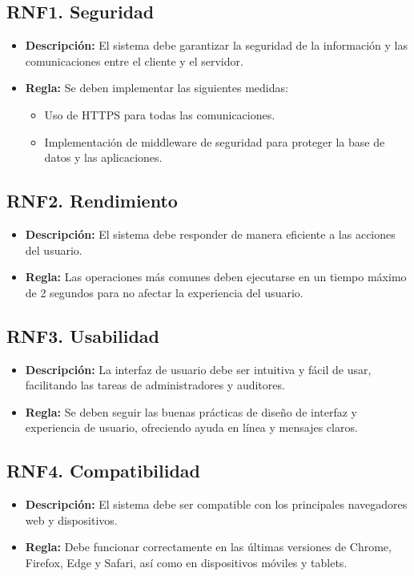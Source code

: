 \documentclass{article}
\begin{document}
\subsection{RNF1. Seguridad}
\begin{itemize}
    \item \textbf{Descripción:} El sistema debe garantizar la seguridad de la información y las comunicaciones entre el cliente y el servidor.
    \item \textbf{Regla:} Se deben implementar las siguientes medidas:
    \begin{itemize}
        \item Uso de HTTPS para todas las comunicaciones.
        \item Implementación de middleware de seguridad para proteger la base de datos y las aplicaciones.
    \end{itemize}
\end{itemize}

\subsection{RNF2. Rendimiento}
\begin{itemize}
    \item \textbf{Descripción:} El sistema debe responder de manera eficiente a las acciones del usuario.
    \item \textbf{Regla:} Las operaciones más comunes deben ejecutarse en un tiempo máximo de 2 segundos para no afectar la experiencia del usuario.
\end{itemize}

\subsection{RNF3. Usabilidad}
\begin{itemize}
    \item \textbf{Descripción:} La interfaz de usuario debe ser intuitiva y fácil de usar, facilitando las tareas de administradores y auditores.
    \item \textbf{Regla:} Se deben seguir las buenas prácticas de diseño de interfaz y experiencia de usuario, ofreciendo ayuda en línea y mensajes claros.
\end{itemize}

\subsection{RNF4. Compatibilidad}
\begin{itemize}
    \item \textbf{Descripción:} El sistema debe ser compatible con los principales navegadores web y dispositivos.
    \item \textbf{Regla:} Debe funcionar correctamente en las últimas versiones de Chrome, Firefox, Edge y Safari, así como en dispositivos móviles y tablets.
\end{itemize}
\end{document}
